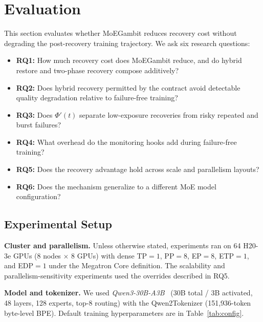 \documentclass[10pt,conference]{IEEEtran}
\begin{document}
\section{Evaluation}
\label{sec:eval}

This section evaluates whether MoEGambit reduces recovery cost without degrading the post-recovery training trajectory. We ask six research questions:

\begin{itemize}
    \item \textbf{RQ1:} How much recovery cost does MoEGambit reduce, and do hybrid restore and two-phase recovery compose additively?
    \item \textbf{RQ2:} Does hybrid recovery permitted by the contract avoid detectable quality degradation relative to failure-free training?
    \item \textbf{RQ3:} Does $\Phi'(t)$ separate low-exposure recoveries from risky repeated and burst failures?
    \item \textbf{RQ4:} What overhead do the monitoring hooks add during failure-free training?
    \item \textbf{RQ5:} Does the recovery advantage hold across scale and parallelism layouts?
    \item \textbf{RQ6:} Does the mechanism generalize to a different MoE model configuration?
\end{itemize}

\subsection{Experimental Setup}

\textbf{Cluster and parallelism.} Unless otherwise stated, experiments ran on 64 H20-3e GPUs (8 nodes $\times$ 8 GPUs) with dense TP$=1$, PP$=8$, EP$=8$, ETP$=1$, and EDP$=1$ under the Megatron Core definition. The scalability and parallelism-sensitivity experiments used the overrides described in RQ5.

\textbf{Model and tokenizer.} We used \emph{Qwen3-30B-A3B}~\cite{qwen3report} (30B total / 3B activated, 48 layers, 128 experts, top-8 routing) with the Qwen2Tokenizer (151{,}936-token byte-level BPE). Default training hyperparameters are in Table~\ref{tab:config}.
\end{document}

